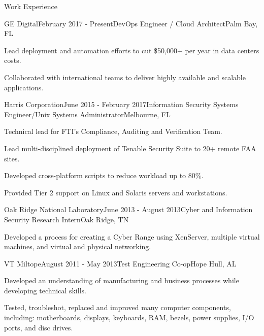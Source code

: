 \documentclass{resume} %
\begin{document}

\begin{rSection}{Work Experience}


\begin{rSubsection}{GE Digital}{February 2017 - Present}{DevOps Engineer / Cloud Architect}{Palm Bay, FL}
\item Lead deployment and automation efforts to cut \$50,000+ per year in data centers costs.
\item Collaborated with international teams to deliver highly available and scalable applications.
\end{rSubsection}



\begin{rSubsection}{Harris Corporation}{June 2015 - February 2017}{Information Security Systems Engineer/Unix Systems Administrator}{Melbourne, FL}
\item Technical lead for FTI's Compliance, Auditing and Verification Team.
\item Lead multi-disciplined deployment of Tenable Security Suite to 20+ remote FAA sites.
\item Developed cross-platform scripts to reduce workload up to 80\%.
\item Provided Tier 2 support on Linux and Solaris servers and workstations.
\end{rSubsection}


\begin{rSubsection}{Oak Ridge National Laboratory}{June 2013 - August 2013}{Cyber and Information Security Research Intern}{Oak Ridge, TN}
\item Developed a process for creating a Cyber Range using XenServer, multiple virtual machines, and virtual and physical networking.
\end{rSubsection}


\begin{rSubsection}{VT Miltope}{August 2011 - May 2013}{Test Engineering Co-op}{Hope Hull, AL}
\item Developed an understanding of manufacturing and business processes while developing technical skills.
\item Tested, troubleshot, replaced and improved many computer components, including: motherboards, displays, keyboards, RAM, bezels, power supplies, I/O ports, and disc drives.
\end{rSubsection}

\end{rSection}
\end{document}
